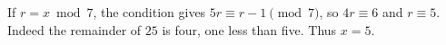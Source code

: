 If $r=x\bmod7$, the condition gives $5r\equiv r-1\pmod7$, so $4r\equiv6$ and $r\equiv5$. Indeed the remainder of $25$ is four, one less than five. Thus $\boxed{x=5}$.
